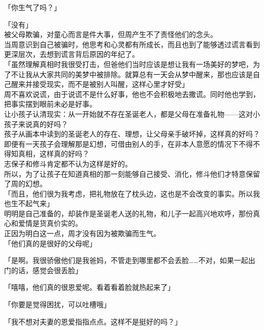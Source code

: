 「你生气了吗？」

「没有」\\

被父母欺骗，对童心而言是件大事，但周产生不了责怪他们的念头。\\

当周意识到自己被骗时，他思考和心灵都有所成长，而且也到了能够透过谎言看到更深层次，去想到谎言背后原因的年纪了。\\

「虽然理解真相时我很受打击，但爸他们当时应该是想让我有一场美好的梦吧，为了不让我从大家共同的美梦中被排除。就算总有一天会从梦中醒来，那也应该是自己醒来并接受现实，而不是被别人叫醒，这样心里才好受」\\

周不喜欢说谎，由于说谎不是什么好事，他也不会积极地去撒谎。同时他也学到，把事实摆到眼前未必是好事。\\

让小孩子认清现实：从一开始就不存在圣诞老人，都是父母在准备礼物——这对小孩子来说真的好吗？\\

孩子从画本中读到的圣诞老人的存在、理想，让父母亲手破坏掉，这样真的好吗？\\

即便有一天孩子会理解那是幻想，可借由别人的手，在非本人意愿的情况下不得不得知真相，这样真的好吗？\\

志保子和修斗肯定都不认为这样是好的。\\

所以，为了让孩子在知道真相的那一刻能够自己接受、消化，修斗他们才特意保留了周的幻想。\\

「而且，他们很为我考虑，把礼物放在了枕头边，这也是不会改变的事实。所以我也生不起气来」\\

明明是自己准备的，却装作是圣诞老人送的礼物，和儿子一起高兴地欢呼，那份真心和爱情是货真价实的。\\

正因为明白这一点，周才没有因为被欺骗而生气。\\

「他们真的是很好的父母呢」

「是啊。我很骄傲他们是我爸妈，不管走到哪里都不会丢脸……不对，如果一起出门的话，感觉会很丢脸」

「嘻嘻，他们真的很恩爱呢。看着看着脸就热起来了」

「你要是觉得困扰，可以吐槽哦」

「我不想对夫妻的恩爱指指点点。这样不是挺好的吗？」

